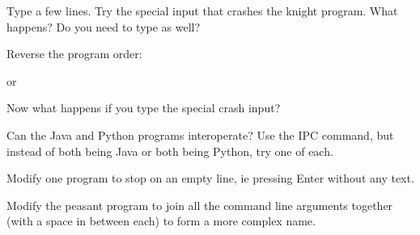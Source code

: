 Type a few lines. Try the special input that crashes the knight program. What
happens? Do you need to type  as well?

Reverse the program order:

or

Now what happens if you type the special crash input?



Can the Java and Python programs interoperate? Use the IPC command, but instead
of both being Java or both being Python, try one of each.

Modify one program to stop on an empty line, ie pressing Enter without any text.

Modify the peasant program to join all the command line arguments together (with
a space in between each) to form a more complex name.



